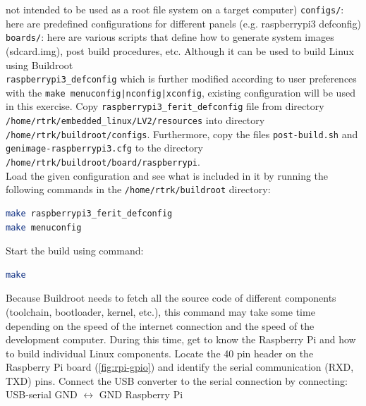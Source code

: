 \documentclass[11pt]{article}
\begin{document}
 not intended to be used as a root file system on a target computer)
\newline
\newline
\texttt{configs/}: here are predefined configurations for different panels
 (e.g. raspberrypi3 defconfig)
\newline
\newline
\texttt{boards/}: here are various scripts that define how to generate system
 images (sdcard.img), post build procedures, etc.
\newline
\newline
Although it can be used to build Linux using Buildroot \\
 \texttt{raspberrypi3\_defconfig} which is further modified according to user
 preferences with the \texttt{make menuconfig|nconfig|xconfig}, existing
 configuration will be used in this exercise. Copy
 \texttt{raspberrypi3\_ferit\_defconfig} file from directory
 \texttt{/home/rtrk/embedded\_linux/LV2/resources} into directory
 \texttt{/home/rtrk/buildroot/configs}. Furthermore, copy the files
 \texttt{post-build.sh} and \texttt{genimage-raspberrypi3.cfg} to the
 directory \texttt{/home/rtrk/buildroot/board/raspberrypi}.\\
\newline
Load the given configuration and see what is included in it by running the
 following commands in the \texttt{/home/rtrk/buildroot} directory:
\begin{lstlisting}[language=bash]
make raspberrypi3_ferit_defconfig
make menuconfig
\end{lstlisting}
Start the build using command:
\begin{lstlisting}[language=bash]
make
\end{lstlisting}
Because Buildroot needs to fetch all the source code of different components
 (toolchain, bootloader, kernel, etc.), this command may take some time
 depending on the speed of the internet connection and the speed of the
 development computer. During this time, get to know the Raspberry Pi and
 how to build individual Linux components.
\newline
\newline
Locate the 40 pin header on the Raspberry Pi board (\ref{fig:rpi-gpio}) and
 identify the serial communication (RXD, TXD) pins. Connect the USB converter
 to the serial connection by connecting:\\
\newline
USB-serial GND $\leftrightarrow$ GND Raspberry Pi \\
\end{document}
